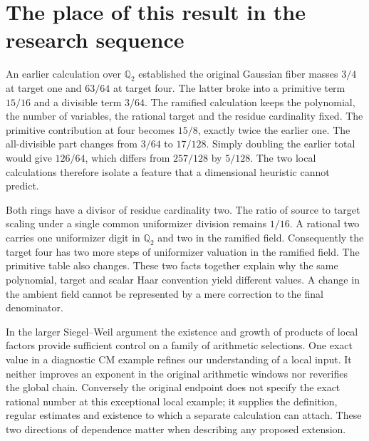 \documentclass[12pt,letterpaper]{article}
\begin{document}
\section{The place of this result in the research sequence}
An earlier calculation over $\mathbb Q_2$ established the original Gaussian fiber masses $3/4$ at target one and $63/64$ at target four. The latter broke into a primitive term $15/16$ and a divisible term $3/64$. The ramified calculation keeps the polynomial, the number of variables, the rational target and the residue cardinality fixed. The primitive contribution at four becomes $15/8$, exactly twice the earlier one. The all-divisible part changes from $3/64$ to $17/128$. Simply doubling the earlier total would give $126/64$, which differs from $257/128$ by $5/128$. The two local calculations therefore isolate a feature that a dimensional heuristic cannot predict.
\par
Both rings have a divisor of residue cardinality two. The ratio of source to target scaling under a single common uniformizer division remains $1/16$. A rational two carries one uniformizer digit in $\mathbb Q_2$ and two in the ramified field. Consequently the target four has two more steps of uniformizer valuation in the ramified field. The primitive table also changes. These two facts together explain why the same polynomial, target and scalar Haar convention yield different values. A change in the ambient field cannot be represented by a mere correction to the final denominator.
\par
In the larger Siegel--Weil argument the existence and growth of products of local factors provide sufficient control on a family of arithmetic selections. One exact value in a diagnostic CM example refines our understanding of a local input. It neither improves an exponent in the original arithmetic windows nor reverifies the global chain. Conversely the original endpoint does not specify the exact rational number at this exceptional local example; it supplies the definition, regular estimates and existence to which a separate calculation can attach. These two directions of dependence matter when describing any proposed extension.
\end{document}
